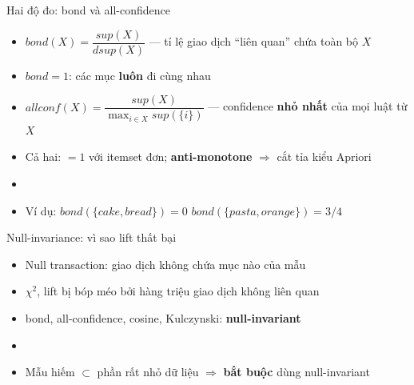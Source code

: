\documentclass[aspectratio=169,11pt]{beamer}
\begin{document}
\begin{frame}{Hai độ đo: bond và all-confidence}
\begin{itemize}\itemsep0.55em
  \item $bond(X) = \dfrac{sup(X)}{dsup(X)}$ --- tỉ lệ giao dịch ``liên quan'' chứa toàn bộ $X$
  \item $bond = 1$: các mục \textbf{luôn} đi cùng nhau
  \item $allconf(X) = \dfrac{sup(X)}{\max_{i \in X} sup(\{i\})}$ --- confidence \textbf{nhỏ nhất} của mọi luật từ $X$
  \item Cả hai: $=1$ với itemset đơn; \textbf{anti-monotone} $\Rightarrow$ cắt tỉa kiểu Apriori
  \item[]
  \item Ví dụ: $bond(\{cake, bread\}) = 0$ \quad\textbullet\quad $bond(\{pasta, orange\}) = 3/4$
\end{itemize}
\end{frame}

\begin{frame}{Null-invariance: vì sao lift thất bại}
\begin{itemize}\itemsep0.7em
  \item Null transaction: giao dịch không chứa mục nào của mẫu
  \item $\chi^2$, lift bị \alert{bóp méo} bởi hàng triệu giao dịch không liên quan
  \item bond, all-confidence, cosine, Kulczynski: \textbf{null-invariant}
  \item[]
  \item Mẫu hiếm $\subset$ phần rất nhỏ dữ liệu $\Rightarrow$ \textbf{bắt buộc} dùng null-invariant
\end{itemize}
\end{frame}
\end{document}
